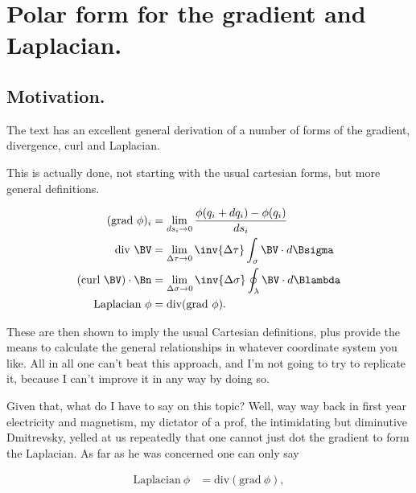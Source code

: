 

\chapter{Polar form for the gradient and Laplacian.}
\label{chap:polarGradAndLaplacian}
{}
\date{Dec 1, 2009}

\beginArtWithToc

\section{Motivation.}

The text \cite{byron1992mca} has an excellent general derivation of a number of forms of the gradient, divergence, curl and Laplacian.

This is actually done, not starting with the usual cartesian forms, but more general definitions.

\begin{align}\label{eqn:divGradCurLap:1}
(\text{grad}\  \phi)_i &= \lim_{ds_i \rightarrow 0} \frac{\phi(q_i + dq_i) - \phi(q_i)}{ds_i} \\
\text{div}\  \BV &= \lim_{\Delta \tau \rightarrow 0} \inv{\Delta \tau} \int_\sigma \BV \cdot d\Bsigma \\
(\text{curl}\  \BV) \cdot \Bn &= \lim_{\Delta \sigma \rightarrow 0} \inv{\Delta \sigma} \oint_\lambda \BV \cdot d\Blambda \\
\text{Laplacian}\  \phi &= \text{div} (\text{grad}\ \phi).
\end{align}

These are then shown to imply the usual Cartesian definitions, plus provide the means to calculate the general relationships in whatever coordinate system you like.  All in all one can't beat this approach, and I'm not going to try to replicate it, because I can't improve it in any way by doing so.

Given that, what do I have to say on this topic?  Well, way way back in first year electricity and magnetism, my dictator of a prof, the intimidating but diminutive Dmitrevsky, yelled at us repeatedly that one cannot just dot the gradient to form the Laplacian.  As far as he was concerned one can only say

\begin{align}\label{eqn:divGradCurLap:2}
\text{Laplacian}\  \phi &= \text{div} (\text{grad}\ \phi),
\end{align}

